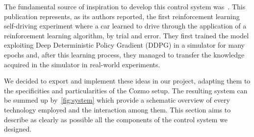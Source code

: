 The fundamental source of inspiration to develop this control system was~\cite{kendall2018learning,kendall2019learning}.
This publication represents, as its authors reported, the first reinforcement learning self-driving experiment where a car learned to drive through the application of a reinforcement learning algorithm, by trial and error.
They first trained the model exploiting Deep Deterministic Policy Gradient (DDPG) in a simulator for many epochs and, after this learning process, they managed to transfer the knowledge acquired in the simulator in real-world experiments.

We decided to export and implement these ideas in our project, adapting them to the specificities and particularities of the Cozmo setup.
The resulting system can be summed up by~\vref{fig:system} which provide a schematic overview of every technology employed and the interaction among them.
This section aims to describe as clearly as possible all the components of the control system we designed.


